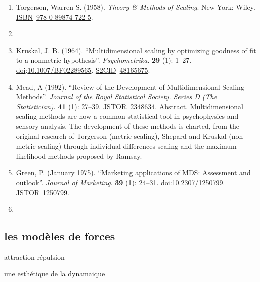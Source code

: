\documentclass[
  letterpaper,
  DIV=11,
  numbers=noendperiod]{scrreprt}
\begin{document}
\begin{enumerate}
\def\labelenumi{\arabic{enumi}.}
\item
  Torgerson, Warren S. (1958). \emph{Theory \& Methods of Scaling}. New
  York: Wiley.
  \href{https://en.wikipedia.org/wiki/ISBN_(identifier)}{ISBN}~\href{https://en.wikipedia.org/wiki/Special:BookSources/978-0-89874-722-5}{978-0-89874-722-5}.
\item
\item
  \href{https://en.wikipedia.org/wiki/Joseph_Kruskal}{Kruskal, J. B.}
  (1964). ``Multidimensional scaling by optimizing goodness of fit to a
  nonmetric hypothesis''. \emph{Psychometrika}. \textbf{29} (1): 1--27.
  \href{https://en.wikipedia.org/wiki/Doi_(identifier)}{doi}:\href{https://doi.org/10.1007\%2FBF02289565}{10.1007/BF02289565}.
  \href{https://en.wikipedia.org/wiki/S2CID_(identifier)}{S2CID}~\href{https://api.semanticscholar.org/CorpusID:48165675}{48165675}.
\item
  Mead, A (1992). ``Review of the Development of Multidimensional
  Scaling Methods''. \emph{Journal of the Royal Statistical Society.
  Series D (The Statistician)}. \textbf{41} (1): 27--39.
  \href{https://en.wikipedia.org/wiki/JSTOR_(identifier)}{JSTOR}~\href{https://www.jstor.org/stable/2348634}{2348634}.
  Abstract. Multidimensional scaling methods are now a common
  statistical tool in psychophysics and sensory analysis. The
  development of these methods is charted, from the original research of
  Torgerson (metric scaling), Shepard and Kruskal (non-metric scaling)
  through individual differences scaling and the maximum likelihood
  methods proposed by Ramsay.
\item
  Green, P. (January 1975). ``Marketing applications of MDS: Assessment
  and outlook''. \emph{Journal of Marketing}. \textbf{39} (1): 24--31.
  \href{https://en.wikipedia.org/wiki/Doi_(identifier)}{doi}:\href{https://doi.org/10.2307\%2F1250799}{10.2307/1250799}.
  \href{https://en.wikipedia.org/wiki/JSTOR_(identifier)}{JSTOR}~\href{https://www.jstor.org/stable/1250799}{1250799}.
\item
\end{enumerate}

\subsection{les modèles de forces}\label{les-moduxe8les-de-forces}

attraction répulsion

une esthétique de la dynamaique
\end{document}
